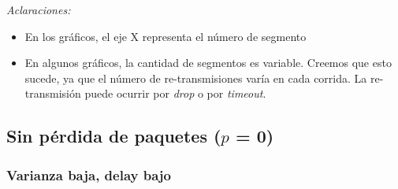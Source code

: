 \emph{Aclaraciones:}
\begin{itemize}
 \item En los gráficos, el eje X representa el número de segmento
 \item En algunos gráficos, la cantidad de segmentos es variable. Creemos que esto sucede, ya que el número de re-transmisiones varía en cada corrida. La re-transmisión puede ocurrir por \emph{drop} o por \emph{timeout}.
\end{itemize}


\subsection{Sin pérdida de paquetes ($p$ = 0)}

\subsubsection{Varianza baja, delay bajo}


